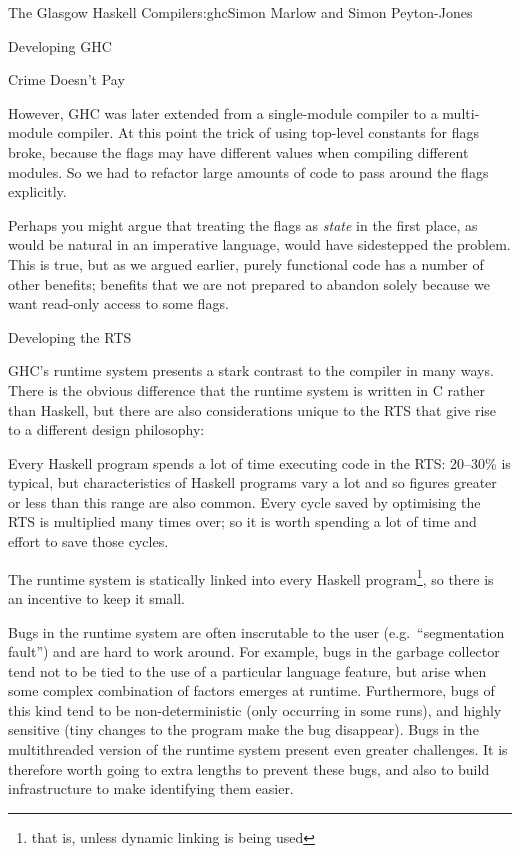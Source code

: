\begin{aosachapter}{The Glasgow Haskell Compiler}{s:ghc}{Simon Marlow and Simon Peyton-Jones}
\begin{aosasect1}{Developing GHC}
\begin{aosasect2}{Crime Doesn't Pay}
\begin{aosaitemize}
  However, GHC was later extended from a single-module compiler to a
  multi-module compiler.  At this point the trick of using top-level
  constants for flags broke, because the flags may have different
  values when compiling different modules.  So we had to refactor
  large amounts of code to pass around the flags explicitly.

  Perhaps you might argue that treating the flags as \emph{state} in
  the first place, as would be natural in an imperative language,
  would have sidestepped the problem.  This is true, but as we argued
  earlier, purely functional code has a number of other benefits;
  benefits that we are not prepared to abandon solely because we want
  read-only access to some flags.

\end{aosaitemize}

\end{aosasect2}

\begin{aosasect2}{Developing the RTS}

GHC's runtime system presents a stark contrast to the compiler in many
ways.  There is the obvious difference that the runtime system is
written in C rather than Haskell, but there are also considerations
unique to the RTS that give rise to a different design philosophy:

\begin{aosaenumerate}

\item Every Haskell program spends a lot of time executing code in the
  RTS: 20--30\% is typical, but characteristics of Haskell programs
  vary a lot and so figures greater or less than this range are also
  common.  Every cycle saved by optimising the RTS is multiplied many
  times over; so it is worth spending a lot of time and effort to save
  those cycles.

\item The runtime system is statically linked into every Haskell
  program\footnote{that is, unless dynamic linking is being used}, so
  there is an incentive to keep it small.

\item Bugs in the runtime system are often inscrutable to the user
  (e.g.\ ``segmentation fault'') and are hard to work around.  For
  example, bugs in the garbage collector tend not to be tied to the
  use of a particular language feature, but arise when some complex
  combination of factors emerges at runtime.  Furthermore, bugs of
  this kind tend to be non-deterministic (only occurring in some
  runs), and highly sensitive (tiny changes to the program make the
  bug disappear).  Bugs in the multithreaded version of the runtime
  system present even greater challenges.  It is therefore worth going
  to extra lengths to prevent these bugs, and also to build
  infrastructure to make identifying them easier.


\end{aosaenumerate}
\end{aosasect2}
\end{aosasect1}
\end{aosachapter}
